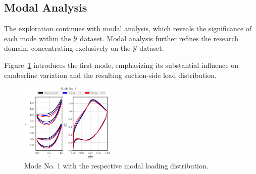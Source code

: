 \documentclass[11pt,a4paper,twocolumn]{article}
\newcommand\widthPCA{0.4}
\begin{document}
\subsection{Modal Analysis}


The exploration continues with modal analysis, which reveals the significance of each mode within the $\mathcal{Y}$ dataset. Modal analysis further refines the research domain, concentrating exclusively on the $\mathcal{Y}$ dataset.

Figure~\ref{fig:PCAmode1} introduces the first mode, emphasizing its substantial influence on camberline variation and the resulting suction-side load distribution.

\begin{figure}[!h]
    \centering
    \includegraphics[width=\widthPCA\textwidth]{./images/mode01.eps}
    \caption{Mode No. 1 with the respective modal loading distribution.}
    \label{fig:PCAmode1}
\end{figure}

\end{document}
